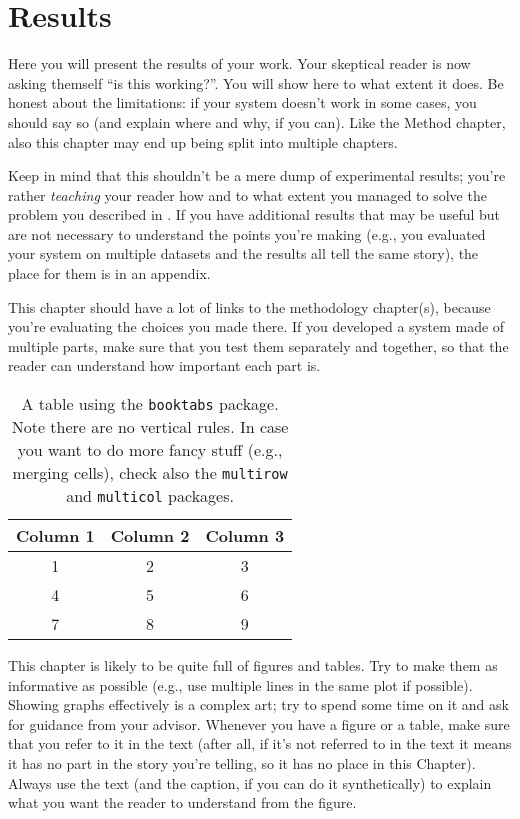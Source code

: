 \chapter{Results}
\label{sec:results}

Here you will present the results of your work. Your skeptical reader is now asking themself
``is this working?''. You will show here to what extent it does. Be honest about the limitations:
if your system doesn't work in some cases, you should say so (and explain where and why, if you
can). Like the Method chapter, also this chapter may end up being split into multiple chapters.

Keep in mind that this shouldn't be a mere dump of experimental results; you're rather
\emph{teaching} your reader how and to what extent you managed to solve the problem you
described in . If you have additional results that may be useful
but are not necessary to understand the points you're making (e.g., you evaluated your system
on multiple datasets and the results all tell the same story), the place for them is in an
appendix.

This chapter should have a lot of links to the methodology chapter(s), because you're
evaluating the choices you made there. If you developed a system made of multiple parts,
make sure that you test them separately and together, so that the reader can understand how
important each part is.

\begin{table}
    \centering
    \begin{tabular}{ccc}
        \toprule
        \textbf{Column 1} & \textbf{Column 2} & \textbf{Column 3} \\
        \midrule
        1 & 2 & 3 \\
        4 & 5 & 6 \\
        7 & 8 & 9 \\
        \bottomrule
    \end{tabular}
    \caption{A table using the \latex{} \texttt{booktabs} package. Note there are no vertical
    rules. In case you want to do more fancy stuff (e.g., merging cells), check also the
    \texttt{multirow} and \texttt{multicol} packages.}
    \label{tab:table}
\end{table}

This chapter is likely to be quite full of figures and tables. Try to make them as informative
as possible (e.g., use multiple lines in the same plot if possible). Showing graphs
effectively is a complex art; try to spend some time on it and ask for guidance from your
advisor. Whenever you have a figure or a table, make sure that you refer to it in the text
(after all, if it's not referred to in the text it means it has no part in the story you're
telling, so it has no place in this Chapter). Always use the text (and the caption, if you can
do it synthetically) to explain what you want the reader to understand from the figure.

